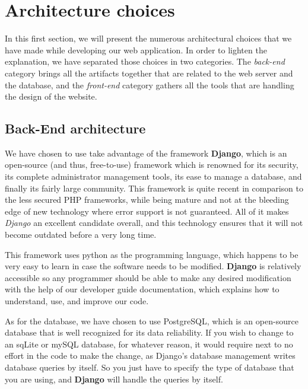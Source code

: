 \section{Architecture choices}
\label{sec:Architecture choices}


In this first section, we will present the numerous architectural choices that we have made while developing our web application. In order to lighten the explanation, we have separated those choices in two categories. The \textit{back-end} category brings all the artifacts together that are related to the web server and the database, and the \textit{front-end} category gathers all the tools that are handling the design of the website.

\subsection{Back-End architecture}

We have chosen to use take advantage of the framework \textbf{Django}, which is an open-source (and thus, free-to-use)
framework which is renowned for its security, its complete administrator management tools, its ease 
to manage a database, and finally its fairly large community. This framework is quite
recent in comparison to the less secured PHP frameworks, while being mature and not at the bleeding edge of new technology where error support is not guaranteed. All of it makes \textit{Django} an excellent candidate overall, and this technology ensures 
that it will not become outdated before a very long time.\newline

This framework uses python as the programming language, which happens to be very easy to
learn in case the software needs to be modified. \textbf{Django} is relatively accessible 
so any programmer should be able to make any desired modification with
the help of our developer guide documentation, which explains how to understand, use, and improve our code.\newline

As for the database, we have chosen to use PostgreSQL, which is an open-source database that is well recognized
for its data reliability. If you wish to change to an sqLite or mySQL database,
for whatever reason, it would require next to no effort in the code to make the change, as Django's database
management writes database queries by itself. So you just have to specify the type of database that you are
using, and \textbf{Django} will handle the queries by itself.\newline

